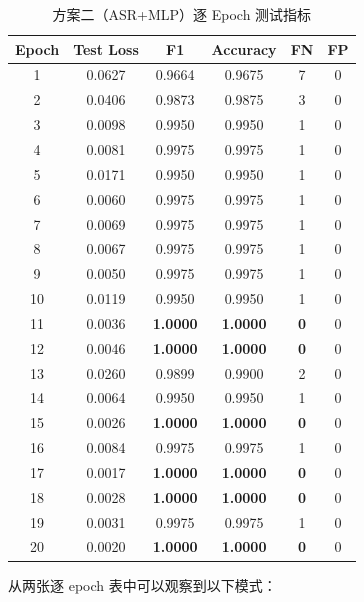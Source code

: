 \documentclass[11pt,a4paper]{ctexart}
\begin{document}
\begin{table}[H]\centering
\caption{方案二（ASR+MLP）逐 Epoch 测试指标}
\label{tab:asr_epochs}
\begin{tabular}{@{}cccccc@{}}\toprule
\textbf{Epoch} & \textbf{Test Loss} & \textbf{F1} & \textbf{Accuracy} & \textbf{FN} & \textbf{FP}\\\midrule
1  & 0.0627 & 0.9664 & 0.9675 & 7  & 0\\
2  & 0.0406 & 0.9873 & 0.9875 & 3  & 0\\
3  & 0.0098 & 0.9950 & 0.9950 & 1  & 0\\
4  & 0.0081 & 0.9975 & 0.9975 & 1  & 0\\
5  & 0.0171 & 0.9950 & 0.9950 & 1  & 0\\
6  & 0.0060 & 0.9975 & 0.9975 & 1  & 0\\
7  & 0.0069 & 0.9975 & 0.9975 & 1  & 0\\
8  & 0.0067 & 0.9975 & 0.9975 & 1  & 0\\
9  & 0.0050 & 0.9975 & 0.9975 & 1  & 0\\
10 & 0.0119 & 0.9950 & 0.9950 & 1  & 0\\
11 & 0.0036 & \textbf{1.0000} & \textbf{1.0000} & \textbf{0} & 0\\
12 & 0.0046 & \textbf{1.0000} & \textbf{1.0000} & \textbf{0} & 0\\
13 & 0.0260 & 0.9899 & 0.9900 & 2  & 0\\
14 & 0.0064 & 0.9950 & 0.9950 & 1  & 0\\
15 & 0.0026 & \textbf{1.0000} & \textbf{1.0000} & \textbf{0} & 0\\
16 & 0.0084 & 0.9975 & 0.9975 & 1  & 0\\
17 & 0.0017 & \textbf{1.0000} & \textbf{1.0000} & \textbf{0} & 0\\
18 & 0.0028 & \textbf{1.0000} & \textbf{1.0000} & \textbf{0} & 0\\
19 & 0.0031 & 0.9975 & 0.9975 & 1  & 0\\
20 & 0.0020 & \textbf{1.0000} & \textbf{1.0000} & \textbf{0} & 0\\\bottomrule
\end{tabular}
\end{table}

从两张逐 epoch 表中可以观察到以下模式：
\end{document}
